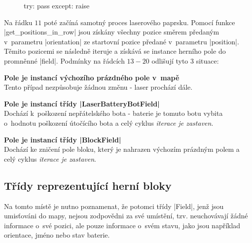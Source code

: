 {\begin{figure}[!h]
\begin{minipage}[b][50\lineheight]{.47\textwidth}
    \begin{code}
try:
    pass
except:
    raise
    \end{code}
    \end{minipage}
    
\end{figure}

\begin{sloppypar}
    Na řádku $11$ poté začíná samotný proces laserového paprsku. Pomocí funkce \ic|get_positions_in_row| jsou získány všechny pozice směrem předaným v~parametru \ic|orientation| ze startovní pozice předané v~parametru \ic|position|. Těmito pozicemi se následně iteruje a získává se instance herního pole do promněnné \ic|field|. Podmínky na řádcích $13-20$ odlišují tyto 3 situace:
\end{sloppypar}

\begin{description}
    \item {\bfseries Pole je instancí výchozího prázdného pole v~mapě} \\
        Tento případ nezpůsobuje žádnou změnu - laser prochází dále.

    \item {\bfseries Pole je instancí třídy \ic|LaserBatteryBotField|} \\
        Dochází k~poškození nepřátelského bota - baterie je tomuto botu vybita o~hodnotu poškození útočícího bota a celý cyklus \emph{iterace je zastaven}.

    \item {\bfseries Pole je instancí třídy \ic|BlockField|} \\
        Dochází ke zničení pole bloku, který je nahrazen výchozím prázdným polem a celý cyklus \emph{iterace je zastaven}.
\end{description}
} %

\subsection{Třídy reprezentující herní bloky}

Na tomto místě je nutno poznamenat, že potomci třídy \ic|Field|, jenž jsou umisťováni do mapy, nejsou zodpovědni za své umístění, tzv. neuchovávají žádné informace o~své pozici, ale pouze informace o~svém stavu, jako jsou například orientace, jméno nebo stav baterie. 

